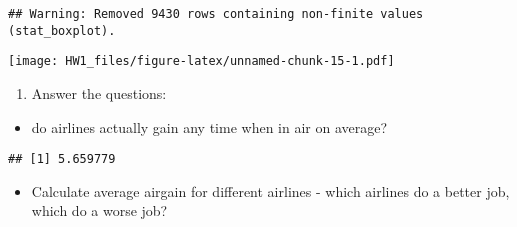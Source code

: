 \documentclass[
]{article}
\newenvironment{Shaded}{\begin{snugshade}}{\end{snugshade}}
\newcommand{\DataTypeTok}[1]{\textcolor[rgb]{0.13,0.29,0.53}{#1}}
\newcommand{\KeywordTok}[1]{\textcolor[rgb]{0.13,0.29,0.53}{\textbf{#1}}}
\newcommand{\NormalTok}[1]{#1}
\newcommand{\OperatorTok}[1]{\textcolor[rgb]{0.81,0.36,0.00}{\textbf{#1}}}
\newcommand{\OtherTok}[1]{\textcolor[rgb]{0.56,0.35,0.01}{#1}}
\newcommand{\StringTok}[1]{\textcolor[rgb]{0.31,0.60,0.02}{#1}}
\providecommand{\tightlist}{%
  \setlength{\itemsep}{0pt}\setlength{\parskip}{0pt}}
\begin{document}
\begin{Shaded}
\end{Shaded}

\begin{verbatim}
## Warning: Removed 9430 rows containing non-finite values (stat_boxplot).
\end{verbatim}

\texttt{[image: HW1\_files/figure-latex/unnamed-chunk-15-1.pdf]}

\begin{enumerate}
\def\labelenumi{\alph{enumi})}
\setcounter{enumi}{1}
\tightlist
\item
  Answer the questions:
\end{enumerate}

\begin{itemize}
\tightlist
\item
  do airlines actually gain any time when in air on average?
\end{itemize}

\begin{Shaded}
\end{Shaded}

\begin{verbatim}
## [1] 5.659779
\end{verbatim}

\begin{itemize}
\tightlist
\item
  Calculate average airgain for different airlines - which airlines do a
  better job, which do a worse job?
\end{itemize}

\begin{Shaded}
\end{Shaded}
\end{document}
